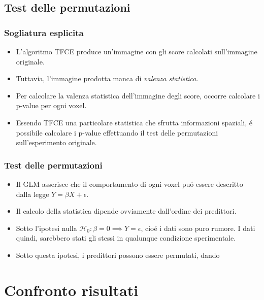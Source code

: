 \documentclass{beamer}
\begin{document}
\subsection{Test delle permutazioni}
\begin{frame}
\frametitle{Sogliatura esplicita}
\begin{itemize}
\item L'algoritmo TFCE produce un'immagine con gli score calcolati sull'immagine originale.

\item Tuttavia, l'immagine prodotta manca di \emph{valenza statistica}.

\item Per calcolare la valenza statistica dell'immagine degli score, occorre calcolare i \alert{p-value} per ogni voxel.

\item Essendo TFCE una particolare statistica che sfrutta informazioni spaziali, \'e possibile calcolare i p-value effettuando il \alert{test delle permutazioni} sull'esperimento originale.
\end{itemize}
\end{frame}

\begin{frame}
\frametitle{Test delle permutazioni}
\begin{itemize}
\item Il GLM asserisce che il comportamento di ogni voxel pu\'o essere descritto dalla legge $Y = \beta X + \epsilon$.
\item Il calcolo della statistica dipende ovviamente dall'ordine dei predittori.
\item Sotto l'ipotesi nulla $\mathcal{H}_0 : \beta = 0 \implies Y = \epsilon$, cio\'e i dati sono puro rumore. I dati quindi, sarebbero stati gli stessi in qualunque condizione sperimentale. 
\item Sotto questa ipotesi, i predittori possono essere permutati, dando
\end{itemize}
\end{frame}

\section{Confronto risultati}
\end{document}
